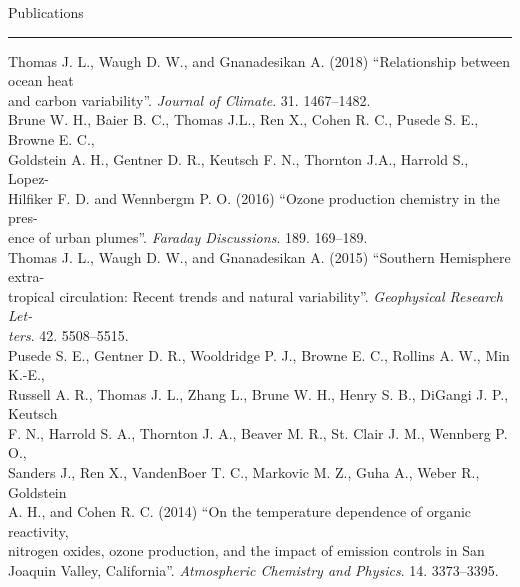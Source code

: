 \begin{cv}
  \vspace{1cm}
  \noindent\Large{Publications}\\
  \vspace{0.2cm}
  \noindent\rule{\textwidth}{0.4pt}
  \normalsize{
  Thomas J. L., Waugh D. W., and Gnanadesikan A. (2018) ``Relationship between ocean heat\\
  \indent and carbon variability''. \textit{Journal of Climate}. 31. 1467--1482. \\
  Brune W. H., Baier B. C., Thomas J.L., Ren X., Cohen R. C., Pusede S. E., Browne E. C.,\\
  \indent Goldstein A. H., Gentner D. R., Keutsch F. N., Thornton J.A., Harrold S., Lopez-\\
  \indent Hilfiker F. D. and  Wennbergm P. O. (2016) ``Ozone production chemistry in the pres-\\
  \indent ence of urban plumes''. \textit{Faraday Discussions}. 189. 169--189. \\
  Thomas J. L., Waugh D. W., and Gnanadesikan A. (2015) ``Southern Hemisphere extra- \\
  \indent tropical circulation: Recent trends and natural variability''.
  \textit{Geophysical Research Let-}\\
  \indent \textit{ters}. 42. 5508--5515. \\
  Pusede S. E., Gentner D. R., Wooldridge P. J., Browne E. C., Rollins A. W., Min K.-E., \\
  \indent Russell A. R., Thomas J. L., Zhang L., Brune W. H., Henry S. B., DiGangi J. P., Keutsch \\
  \indent F. N., Harrold S. A., Thornton  J. A., Beaver M. R., St. Clair J. M., Wennberg P. O., \\
  \indent  Sanders J., Ren X., VandenBoer T. C., Markovic M. Z., Guha A., Weber R., Goldstein  \\
  \indent A. H., and Cohen R. C. (2014) ``On the temperature dependence of organic reactivity,\\
  \indent nitrogen oxides, ozone production, and the impact of emission controls in San \\
  \indent Joaquin Valley, California''. \textit{Atmospheric Chemistry and Physics}. 14. 3373--3395.

}
\end{cv}
